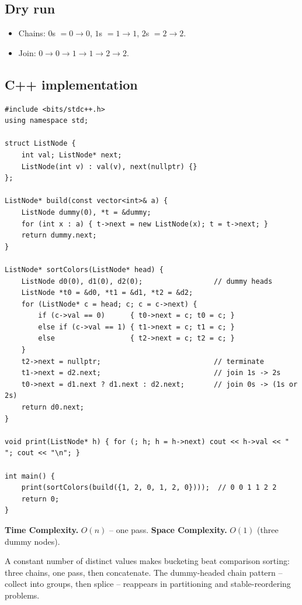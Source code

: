 \subsection*{Dry run}


\begin{itemize}
  \item Chains: $0$s $=0\to0$, $1$s $=1\to1$, $2$s $=2\to2$.
  \item Join: $0\to0\to1\to1\to2\to2$.
\end{itemize}

\subsection*{C++ implementation}

\begin{lstlisting}
#include <bits/stdc++.h>
using namespace std;

struct ListNode {
    int val; ListNode* next;
    ListNode(int v) : val(v), next(nullptr) {}
};

ListNode* build(const vector<int>& a) {
    ListNode dummy(0), *t = &dummy;
    for (int x : a) { t->next = new ListNode(x); t = t->next; }
    return dummy.next;
}

ListNode* sortColors(ListNode* head) {
    ListNode d0(0), d1(0), d2(0);                 // dummy heads
    ListNode *t0 = &d0, *t1 = &d1, *t2 = &d2;
    for (ListNode* c = head; c; c = c->next) {
        if (c->val == 0)      { t0->next = c; t0 = c; }
        else if (c->val == 1) { t1->next = c; t1 = c; }
        else                  { t2->next = c; t2 = c; }
    }
    t2->next = nullptr;                           // terminate
    t1->next = d2.next;                           // join 1s -> 2s
    t0->next = d1.next ? d1.next : d2.next;       // join 0s -> (1s or 2s)
    return d0.next;
}

void print(ListNode* h) { for (; h; h = h->next) cout << h->val << " "; cout << "\n"; }

int main() {
    print(sortColors(build({1, 2, 0, 1, 2, 0})));  // 0 0 1 1 2 2
    return 0;
}
\end{lstlisting}

\begin{complexitybox}
\textbf{Time Complexity.} $O(n)$ -- one pass. \textbf{Space Complexity.}
$O(1)$ (three dummy nodes).
\end{complexitybox}

\begin{takeawaybox}
A constant number of distinct values makes bucketing beat comparison
sorting: three chains, one pass, then concatenate. The dummy-headed chain
pattern -- collect into groups, then splice -- reappears in partitioning and
stable-reordering problems.
\end{takeawaybox}

